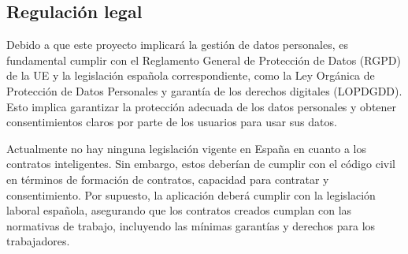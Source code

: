 \subsection{Regulación legal}

Debido a que este proyecto implicará la gestión de datos personales, es fundamental cumplir con el Reglamento General de Protección de Datos (RGPD) de la UE y la legislación española correspondiente, como la Ley Orgánica de Protección de Datos Personales y garantía de los derechos digitales (LOPDGDD). Esto implica garantizar la protección adecuada de los datos personales y obtener consentimientos claros por parte de los usuarios para usar sus datos.

Actualmente no hay ninguna legislación vigente en España en cuanto a los contratos inteligentes. Sin embargo, estos deberían de cumplir con el código civil en términos de formación de contratos, capacidad para contratar y consentimiento.
Por supuesto, la aplicación deberá cumplir con la legislación laboral española, asegurando que los contratos creados cumplan con las normativas de trabajo, incluyendo las mínimas garantías y derechos para los trabajadores.
